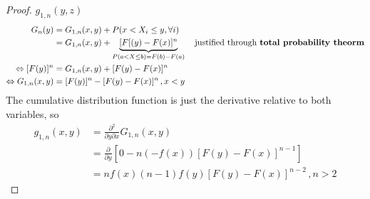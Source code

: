 \begin{proof}
    $g_{1,n}(y,z)$
    \begin{align*}
        G_n(y) & = G_{1,n}(x,y) + P(x<X_i\leq y, \forall i)\\
        & = G_{1,n}(x,y) + \underbrace{[F[(y) - F(x)]^n}_{P(a<X\leq b) = F(b)-F(a)}\quad \text{justified through \textbf{total probability theorm}}\\
        \Leftrightarrow [F(y)]^n & = G_{1,n}(x,y) + [F(y)-F(x)]^n\\
        \Leftrightarrow G_{1,n}(x,y) & = [F(y)]^n - [F(y)-F(x)]^n \, ,x<y
    \end{align*}
    The cumulative distribution function is just the derivative relative to both variables, so
    \begin{align*}
        g_{1,n}(x,y) & = \frac{\partial^2}{\partial y\partial x}G_{1,n}(x,y)\\
        & = \frac{\partial}{\partial y}[0-n(-f(x))[F(y)-F(x)]^{n-1}]\\
        & = nf(x)(n-1)f(y)[F(y)-F(x)]^{n-2}\, ,n>2
    \end{align*}
\end{proof}


